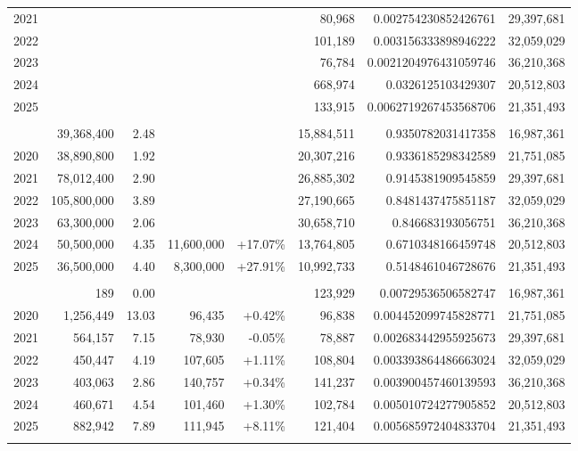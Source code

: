 \begin{table}[!t]
\begin{tabular*}{\linewidth}{@{\extracolsep{\fill}}l|rrrrrrr}
2021 &  &  &  &  & 80,968 & 0.002754230852426761 & 29,397,681 \\
2022 &  &  &  &  & 101,189 & 0.003156333898946222 & 32,059,029 \\
2023 &  &  &  &  & 76,784 & 0.0021204976431059746 & 36,210,368 \\
2024 &  &  &  &  & 668,974 & 0.0326125103429307 & 20,512,803 \\
2025 &  &  &  &  & 133,915 & 0.0062719267453568706 & 21,351,493 \\
\midrule\addlinespace[2.5pt]
\multicolumn{8}{l}{Meta} \\[2.5pt] 
\midrule\addlinespace[2.5pt]
2019 & 39,368,400 & 2.48 &  &  & 15,884,511 & 0.9350782031417358 & 16,987,361 \\
2020 & 38,890,800 & 1.92 &  &  & 20,307,216 & 0.9336185298342589 & 21,751,085 \\
2021 & 78,012,400 & 2.90 &  &  & 26,885,302 & 0.9145381909545859 & 29,397,681 \\
2022 & 105,800,000 & 3.89 &  &  & 27,190,665 & 0.8481437475851187 & 32,059,029 \\
2023 & 63,300,000 & 2.06 &  &  & 30,658,710 & 0.846683193056751 & 36,210,368 \\
2024 & 50,500,000 & 4.35 & 11,600,000 & +17.07\% & 13,764,805 & 0.6710348166459748 & 20,512,803 \\
2025 & 36,500,000 & 4.40 & 8,300,000 & +27.91\% & 10,992,733 & 0.5148461046728676 & 21,351,493 \\
\midrule\addlinespace[2.5pt]
\multicolumn{8}{l}{Microsoft} \\[2.5pt] 
\midrule\addlinespace[2.5pt]
2019 & 189 & 0.00 &  &  & 123,929 & 0.00729536506582747 & 16,987,361 \\
2020 & 1,256,449 & 13.03 & 96,435 & +0.42\% & 96,838 & 0.004452099745828771 & 21,751,085 \\
2021 & 564,157 & 7.15 & 78,930 & -0.05\% & 78,887 & 0.002683442955925673 & 29,397,681 \\
2022 & 450,447 & 4.19 & 107,605 & +1.11\% & 108,804 & 0.003393864486663024 & 32,059,029 \\
2023 & 403,063 & 2.86 & 140,757 & +0.34\% & 141,237 & 0.003900457460139593 & 36,210,368 \\
2024 & 460,671 & 4.54 & 101,460 & +1.30\% & 102,784 & 0.005010724277905852 & 20,512,803 \\
2025 & 882,942 & 7.89 & 111,945 & +8.11\% & 121,404 & 0.005685972404833704 & 21,351,493 \\
\midrule\addlinespace[2.5pt]

\end{tabular*}
\end{table}
